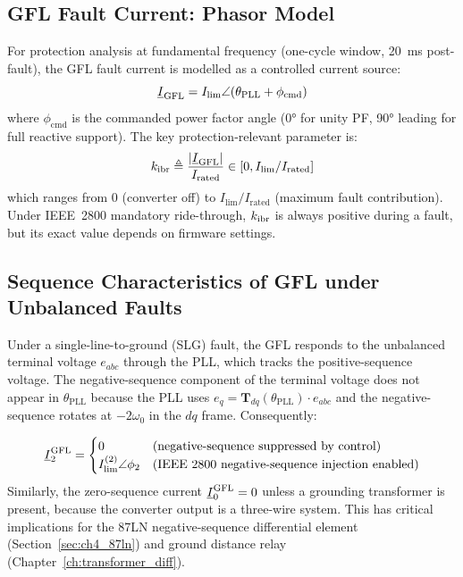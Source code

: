 \subsection{GFL Fault Current: Phasor Model}

For protection analysis at fundamental frequency (one-cycle window,
20~ms post-fault), the GFL fault current is modelled as a controlled
current source:
\begin{equation}
  \underline{I}_\mathrm{GFL} = I_\mathrm{lim} \angle(\theta_\mathrm{PLL} + \phi_\mathrm{cmd})
  \label{eq:ch2_gfl_phasor}
\end{equation}
where $\phi_\mathrm{cmd}$ is the commanded power factor angle (0° for unity PF,
90° leading for full reactive support). The key protection-relevant parameter is:
\begin{equation}
  k_{\mathrm{ibr}} \triangleq \frac{|\underline{I}_\mathrm{GFL}|}{I_\mathrm{rated}}
  \in [0, I_\mathrm{lim}/I_\mathrm{rated}]
  \label{eq:ch2_kibr_def}
\end{equation}
which ranges from 0 (converter off) to $I_\mathrm{lim}/I_\mathrm{rated}$
(maximum fault contribution). Under IEEE~2800 mandatory ride-through,
$k_{\mathrm{ibr}}$ is always positive during a fault, but its exact value depends on
firmware settings.

\subsection{Sequence Characteristics of GFL under Unbalanced Faults}

Under a single-line-to-ground (SLG) fault, the GFL responds to the
unbalanced terminal voltage $e_{abc}$ through the PLL, which tracks the
positive-sequence voltage. The negative-sequence component of the terminal
voltage does not appear in $\theta_\mathrm{PLL}$ because the PLL uses
$e_q = \mathbf{T}_{dq}(\theta_\mathrm{PLL}) \cdot e_{abc}$ and the
negative-sequence rotates at $-2\omega_0$ in the $dq$ frame. Consequently:

\begin{equation}
  \underline{I}_2^\mathrm{GFL} = \begin{cases}
    0 & \text{(negative-sequence suppressed by control)} \\
    I_\mathrm{lim}^{(2)}\angle\phi_2 & \text{(IEEE 2800 negative-sequence injection enabled)}
  \end{cases}
  \label{eq:ch2_gfl_negseq}
\end{equation}
Similarly, the zero-sequence current $\underline{I}_0^\mathrm{GFL} = 0$ unless
a grounding transformer is present, because the converter output is a
three-wire system. This has critical implications for the 87LN negative-sequence
differential element (Section~\ref{sec:ch4_87ln}) and ground distance
relay (Chapter~\ref{ch:transformer_diff}).

